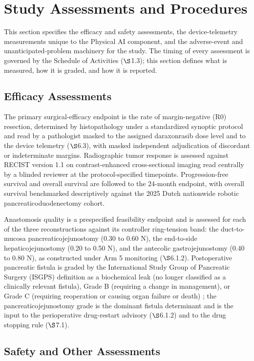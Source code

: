 \section{Study Assessments and Procedures}

This section specifies the efficacy and safety assessments, the device-telemetry
measurements unique to the Physical AI component, and the adverse-event and
unanticipated-problem machinery for the study. The timing of every assessment is
governed by the Schedule of Activities ($\S$1.3); this section defines what is
measured, how it is graded, and how it is reported.

\subsection{Efficacy Assessments}

The primary surgical-efficacy endpoint is the rate of margin-negative (R0)
resection, determined by histopathology under a standardized synoptic protocol and
read by a pathologist masked to the assigned daraxonrasib dose level and to the
device telemetry ($\S$6.3), with masked independent adjudication of discordant or
indeterminate margins. Radiographic tumor response is assessed against RECIST
version 1.1 on contrast-enhanced cross-sectional imaging read centrally by a
blinded reviewer at the protocol-specified timepoints. Progression-free survival
and overall survival are followed to the 24-month endpoint, with overall survival
benchmarked descriptively against the 2025 Dutch nationwide robotic
pancreaticoduodenectomy cohort.

Anastomosis quality is a prespecified feasibility endpoint and is assessed for each
of the three reconstructions against its controller ring-tension band: the
duct-to-mucosa pancreaticojejunostomy (0.30 to 0.60 N), the end-to-side
hepaticojejunostomy (0.20 to 0.50 N), and the antecolic gastrojejunostomy (0.40 to
0.80 N), as constructed under Arm 5 monitoring ($\S$6.1.2). Postoperative
pancreatic fistula is graded by the International Study Group of Pancreatic Surgery
(ISGPS) definition as a biochemical leak (no longer classified as a clinically
relevant fistula), Grade B (requiring a change in management), or Grade C
(requiring reoperation or causing organ failure or death) \cite{Bassi2017}; the
pancreaticojejunostomy grade is the dominant fistula determinant and is the input
to the perioperative drug-restart advisory ($\S$6.1.2) and to the drug stopping
rule ($\S$7.1).

\subsection{Safety and Other Assessments}

